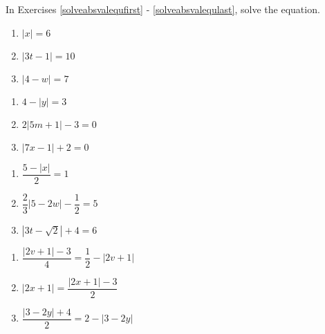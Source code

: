 \documentclass{ximera}
\begin{document}
	\author{Stitz-Zeager}



\label{ExercisesforAppAbsValEqIneq}

In Exercises \ref{solveabsvalequfirst} - \ref{solveabsvalequlast}, solve the equation.

\begin{multicols}{3}
\begin{enumerate}

\item  $|x| = 6$ \label{solveabsvalequfirst} 
\item $|3t-1| = 10$
\item $|4-w| = 7$

\setcounter{HW}{\value{enumi}}
\end{enumerate}
\end{multicols}

\begin{multicols}{3}
\begin{enumerate}
\setcounter{enumi}{\value{HW}}

\item  $4 - |y| = 3$
\item $2|5m+1| - 3 = 0$
\item $|7x-1| + 2 = 0$

\setcounter{HW}{\value{enumi}}
\end{enumerate}
\end{multicols}

\begin{multicols}{3}
\begin{enumerate}
\setcounter{enumi}{\value{HW}}

\item $\dfrac{5 - |x|}{2} = 1$ 
\item $\dfrac{2}{3} |5-2w| - \dfrac{1}{2} = 5$ 
\item $|3t - \sqrt{2}| + 4 = 6$ 
\setcounter{HW}{\value{enumi}}
\end{enumerate}
\end{multicols}


\begin{multicols}{3}
\begin{enumerate}
\setcounter{enumi}{\value{HW}}

\item $\dfrac{|2v+1| - 3}{4} = \dfrac{1}{2} - |2v+1|$
\item $|2x+1| = \dfrac{|2x+1| - 3}{2}$
\item $\dfrac{|3-2y|+ 4}{2} = 2 - |3-2y|$

\setcounter{HW}{\value{enumi}}
\end{enumerate}
\end{multicols}
\end{document}
